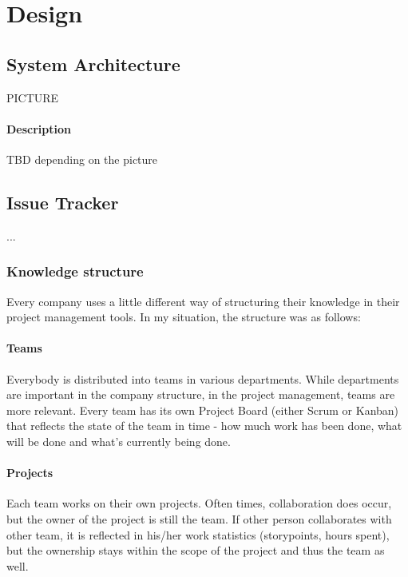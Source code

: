 \chapter{Design}

\section{System Architecture}

PICTURE

\subsubsection*{Description}
TBD depending on the picture



\section{Issue Tracker}

...

\subsection{Knowledge structure}

Every company uses a little different way of structuring their knowledge in their project management tools. In my situation, the structure was as follows:

\subsubsection{Teams}

Everybody is distributed into teams in various departments. While departments are important in the company structure, in the project management, teams are more relevant. Every team has its own Project Board (either Scrum or Kanban) that reflects the state of the team in time - how much work has been done, what will be done and what's currently being done.

\subsubsection{Projects}

Each team works on their own projects. Often times, collaboration does occur, but the owner of the project is still the team. If other person collaborates with other team, it is reflected in his/her work statistics  (storypoints, hours spent), but the ownership stays within the scope of the project and thus the team as well.

